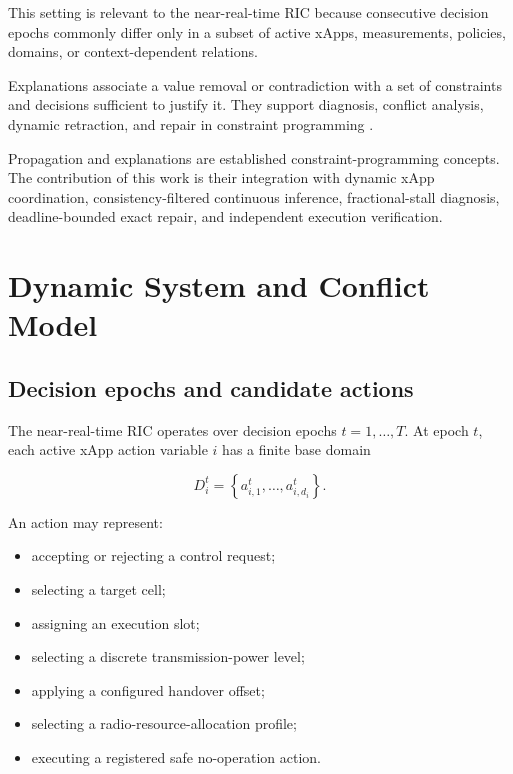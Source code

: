 \documentclass[pdflatex,sn-mathphys-num,iicol,oneside]{sn-jnl}
\begin{document}
This setting is relevant to the near-real-time RIC because consecutive
decision epochs commonly differ only in a subset of active xApps,
measurements, policies, domains, or context-dependent relations.

Explanations associate a value removal or contradiction with a set of
constraints and decisions sufficient to justify it. They support
diagnosis, conflict analysis, dynamic retraction, and repair in
constraint programming \cite{gupta2021explanations}.

Propagation and explanations are established constraint-programming
concepts. The contribution of this work is their integration with
dynamic xApp coordination, consistency-filtered continuous inference,
fractional-stall diagnosis, deadline-bounded exact repair, and
independent execution verification.

\section{Dynamic System and Conflict Model}
\label{sec:model}

\subsection{Decision epochs and candidate actions}

The near-real-time RIC operates over decision epochs
$t=1,\ldots,T$. At epoch $t$, each active xApp action variable $i$
has a finite base domain

\begin{equation}
D_i^t
=
\left\{
a_{i,1}^t,\ldots,a_{i,d_i}^t
\right\}.
\end{equation}

An action may represent:

\begin{itemize}
    \item accepting or rejecting a control request;
    \item selecting a target cell;
    \item assigning an execution slot;
    \item selecting a discrete transmission-power level;
    \item applying a configured handover offset;
    \item selecting a radio-resource-allocation profile;
    \item executing a registered safe no-operation action.
\end{itemize}
\end{document}

